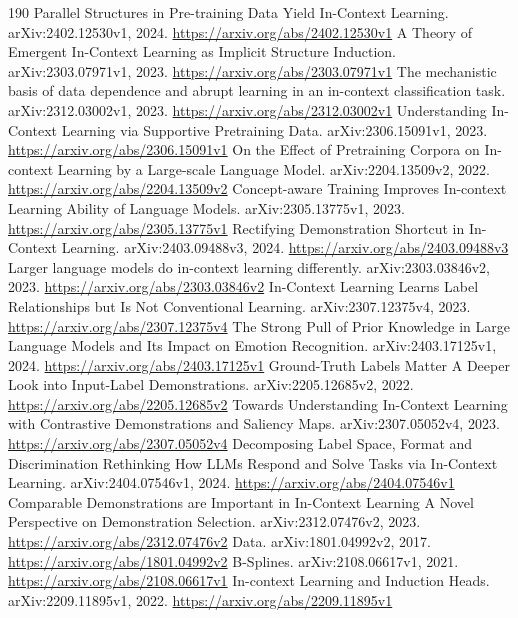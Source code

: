 \documentclass[11pt]{article}
\begin{document}
\begin{thebibliography}{190}
 Parallel Structures in Pre-training Data Yield In-Context Learning. arXiv:2402.12530v1, 2024. \url{https://arxiv.org/abs/2402.12530v1}
 A Theory of Emergent In-Context Learning as Implicit Structure Induction. arXiv:2303.07971v1, 2023. \url{https://arxiv.org/abs/2303.07971v1}
 The mechanistic basis of data dependence and abrupt learning in an in-context classification task. arXiv:2312.03002v1, 2023. \url{https://arxiv.org/abs/2312.03002v1}
 Understanding In-Context Learning via Supportive Pretraining Data. arXiv:2306.15091v1, 2023. \url{https://arxiv.org/abs/2306.15091v1}
 On the Effect of Pretraining Corpora on In-context Learning by a Large-scale Language Model. arXiv:2204.13509v2, 2022. \url{https://arxiv.org/abs/2204.13509v2}
 Concept-aware Training Improves In-context Learning Ability of Language Models. arXiv:2305.13775v1, 2023. \url{https://arxiv.org/abs/2305.13775v1}
 Rectifying Demonstration Shortcut in In-Context Learning. arXiv:2403.09488v3, 2024. \url{https://arxiv.org/abs/2403.09488v3}
 Larger language models do in-context learning differently. arXiv:2303.03846v2, 2023. \url{https://arxiv.org/abs/2303.03846v2}
 In-Context Learning Learns Label Relationships but Is Not Conventional Learning. arXiv:2307.12375v4, 2023. \url{https://arxiv.org/abs/2307.12375v4}
 The Strong Pull of Prior Knowledge in Large Language Models and Its Impact on Emotion Recognition. arXiv:2403.17125v1, 2024. \url{https://arxiv.org/abs/2403.17125v1}
 Ground-Truth Labels Matter A Deeper Look into Input-Label Demonstrations. arXiv:2205.12685v2, 2022. \url{https://arxiv.org/abs/2205.12685v2}
 Towards Understanding In-Context Learning with Contrastive Demonstrations and Saliency Maps. arXiv:2307.05052v4, 2023. \url{https://arxiv.org/abs/2307.05052v4}
 Decomposing Label Space, Format and Discrimination Rethinking How LLMs Respond and Solve Tasks via In-Context Learning. arXiv:2404.07546v1, 2024. \url{https://arxiv.org/abs/2404.07546v1}
 Comparable Demonstrations are Important in In-Context Learning A Novel Perspective on Demonstration Selection. arXiv:2312.07476v2, 2023. \url{https://arxiv.org/abs/2312.07476v2}
 Data. arXiv:1801.04992v2, 2017. \url{https://arxiv.org/abs/1801.04992v2}
 B-Splines. arXiv:2108.06617v1, 2021. \url{https://arxiv.org/abs/2108.06617v1}
 In-context Learning and Induction Heads. arXiv:2209.11895v1, 2022. \url{https://arxiv.org/abs/2209.11895v1}

\end{thebibliography}
\end{document}
